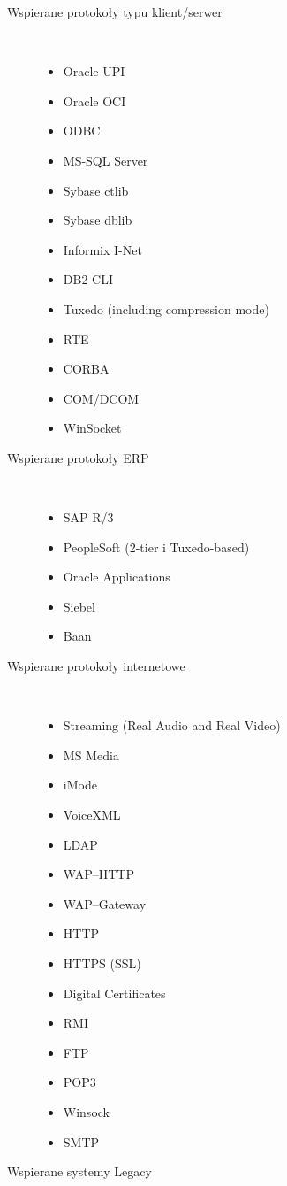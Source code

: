 \begin{description}
\item[Wspierane protokoły typu klient/serwer]\
	\begin{itemize}
	\item Oracle UPI
	\item Oracle OCI
	\item ODBC
	\item MS-SQL Server
	\item Sybase ctlib
	\item Sybase dblib
	\item Informix I-Net
	\item DB2 CLI
	\item Tuxedo (including compression mode)
	\item RTE
	\item CORBA
	\item COM/DCOM
	\item WinSocket
	\end{itemize}
\item[Wspierane protokoły ERP]\
	\begin{itemize}
	\item SAP R/3
	\item PeopleSoft (2-tier i Tuxedo-based)
	\item Oracle Applications
	\item Siebel
	\item Baan
	\end{itemize}
\item[Wspierane protokoły internetowe]\
	\begin{itemize}
	\item Streaming (Real Audio and Real Video)
	\item MS Media
	\item iMode
	\item VoiceXML
	\item LDAP
	\item WAP--HTTP
	\item WAP--Gateway
	\item HTTP
	\item HTTPS (SSL)
	\item Digital Certificates
	\item RMI
	\item FTP
	\item POP3
	\item Winsock
	\item SMTP
	\end{itemize}
\item[Wspierane systemy Legacy]\

\end{description}
